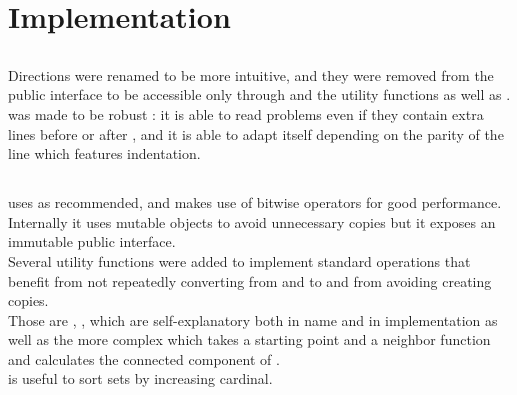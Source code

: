 \section{Implementation}


\subsection{}

Directions were renamed to be more intuitive, and they were removed
from the public interface to be accessible only through 
and the utility functions  as well as .\\

 was made to be robust : it is able to read problems even
if they contain extra lines before  or after ,
and it is able to adapt itself depending on the parity of the line which
features indentation.


\subsection{}

 uses  as recommended, and makes use of
bitwise operators for good performance.\\

Internally it uses mutable objects to avoid unnecessary copies but it exposes
an immutable public interface.\\

Several utility functions were added to implement standard operations that benefit
from not repeatedly converting from and to  and from avoiding creating
copies.\\
Those are , ,  which are self-explanatory
both in name and in implementation as well as the more complex
 which takes a starting point and a 
neighbor function and calculates the connected component of .\\
 is useful to sort sets by increasing cardinal.


